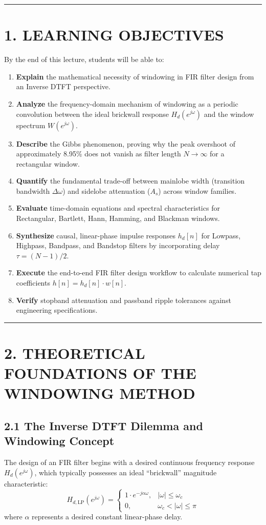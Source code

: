 \documentclass[11pt,a4paper]{article}
\begin{document}
\noindent\rule{\textwidth}{0.5pt}

\section{1. LEARNING OBJECTIVES}
By the end of this lecture, students will be able to:
\begin{enumerate}
    \item \textbf{Explain} the mathematical necessity of windowing in FIR filter design from an Inverse DTFT perspective.
    \item \textbf{Analyze} the frequency-domain mechanism of windowing as a periodic convolution between the ideal brickwall response $H_d(e^{j\omega})$ and the window spectrum $W(e^{j\omega})$.
    \item \textbf{Describe} the Gibbs phenomenon, proving why the peak overshoot of approximately 8.95\% does not vanish as filter length $N \to \infty$ for a rectangular window.
    \item \textbf{Quantify} the fundamental trade-off between mainlobe width (transition bandwidth $\Delta\omega$) and sidelobe attenuation ($A_s$) across window families.
    \item \textbf{Evaluate} time-domain equations and spectral characteristics for Rectangular, Bartlett, Hann, Hamming, and Blackman windows.
    \item \textbf{Synthesize} causal, linear-phase impulse responses $h_d[n]$ for Lowpass, Highpass, Bandpass, and Bandstop filters by incorporating delay $\tau = (N-1)/2$.
    \item \textbf{Execute} the end-to-end FIR filter design workflow to calculate numerical tap coefficients $h[n] = h_d[n] \cdot w[n]$.
    \item \textbf{Verify} stopband attenuation and passband ripple tolerances against engineering specifications.
\end{enumerate}

\noindent\rule{\textwidth}{0.5pt}

\section{2. THEORETICAL FOUNDATIONS OF THE WINDOWING METHOD}

\subsection{2.1 The Inverse DTFT Dilemma and Windowing Concept}
The design of an FIR filter begins with a desired continuous frequency response $H_d(e^{j\omega})$, which typically possesses an ideal ``brickwall'' magnitude characteristic:
\begin{equation}
H_{d,\text{LP}}(e^{j\omega}) = \begin{cases} 1 \cdot e^{-j\alpha \omega}, & |\omega| \le \omega_c \\ 0, & \omega_c < |\omega| \le \pi \end{cases}
\end{equation}
where $\alpha$ represents a desired constant linear-phase delay.
\end{document}
